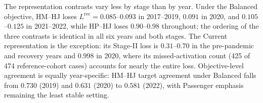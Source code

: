 The representation contrasts vary less by stage than by year. Under the Balanced objective, HM--HJ loses $L^{\mathrm{rec}}=0.085$--$0.093$ in 2017--2019, $0.091$ in 2020, and $0.105$--$0.125$ in 2021--2022, while HP--HJ loses $0.90$--$0.98$ throughout; the ordering of the three contrasts is identical in all six years and both stages. The Current representation is the exception: its Stage-II loss is $0.31$--$0.70$ in the pre-pandemic and recovery years and $0.998$ in 2020, where its missed-activation count (425 of 474 reference-cohort cases) accounts for nearly the entire loss. Objective-level agreement is equally year-specific: HM--HJ target agreement under Balanced falls from $0.730$ (2019) and $0.631$ (2020) to $0.581$ (2022), with Passenger emphasis remaining the least stable setting.

